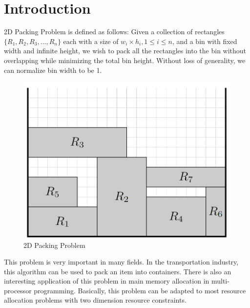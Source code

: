 \documentclass[sigplan,screen,nonacm]{acmart}\settopmatter{printfolios=true,printccs=false,printacmref=false}
\begin{document}
\maketitle

\section{Introduction}
2D Packing Problem is defined as follows: Given a collection of rectangles $\{R_1,R_2,R_3,\dots,R_n\}$ each with a size of $w_i\times h_i, 1\leq i\leq n$, and a bin with fixed width and infinite height, we wish to pack all the rectangles into the bin without overlapping while minimizing the total bin height\cite{baker1980orthogonal}. Without loss of generality, we can normalize bin width to be 1.\par
\begin{figure}[htbp]
  \centering
  \includegraphics[scale=0.5]{2dpacking}
  \caption{2D Packing Problem}
  \label{fig:2dpacking}
\end{figure}
This problem is very important in many fields. In the transportation industry, this algorithm can be used to pack an item into containers. There is also an interesting application of this problem in main memory allocation in multi-processor programming. Basically, this problem can be adapted to most resource allocation problems with two dimension resource constraints.\par
\end{document}
